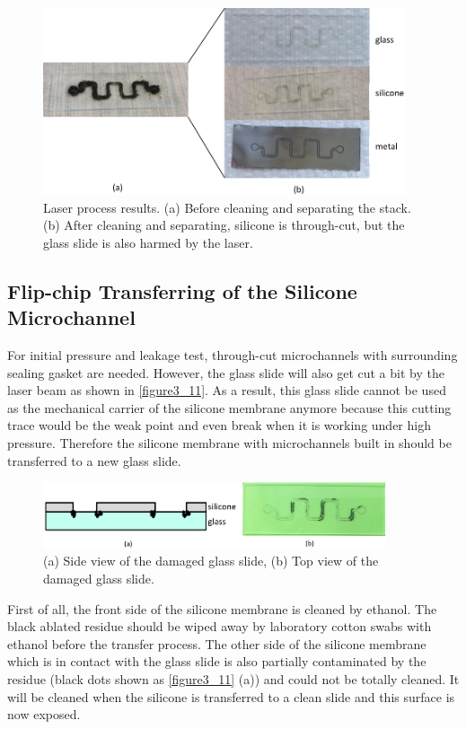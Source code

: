 \begin{figure}[ht]%
\centering
\includegraphics[width=0.95\textwidth]{figures/designandfabrication/figure3_10}%
\caption{Laser process results. (a) Before cleaning and separating the stack. (b) After cleaning and separating, silicone is through-cut, but the glass slide is also harmed by the laser.}%
\label{figure3_10}%
\end{figure}

\subsection{Flip-chip Transferring of the Silicone Microchannel}
\label{3_4_2}
For initial pressure and leakage test, through-cut microchannels with surrounding sealing gasket are needed. However, the glass slide will also get cut a bit by the laser beam as shown in \autoref{figure3_11}. As a result, this glass slide cannot be used as the mechanical carrier of the silicone membrane anymore because this cutting trace would be the weak point and even break when it is working under high pressure. Therefore the silicone membrane with microchannels built in should be transferred to a new glass slide.\\

\begin{figure}[h]%
\centering
\includegraphics[width=0.9\textwidth]{figures/designandfabrication/figure3_11}%
\caption{(a) Side view of the damaged glass slide, (b) Top view of the damaged glass slide.}%
\label{figure3_11}%
\end{figure}

First of all, the front side of the silicone membrane is cleaned by ethanol. The black ablated residue should be wiped away by laboratory cotton swabs with ethanol before the transfer process. The other side of the silicone membrane which is in contact with the glass slide is also partially contaminated by the residue (black dots shown as \autoref{figure3_11} (a)) and could not be totally cleaned. It will be cleaned when the silicone is transferred to a clean slide and this surface is now exposed.\\

